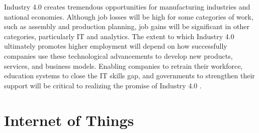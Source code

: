 Industry 4.0 creates tremendous opportunities for manufacturing industries and national economies. Although job losses will be high for some categories of work, such as assembly and production planning, job gains will be significant in other categories, particularly IT and analytics. The extent to which Industry 4.0 ultimately promotes higher employment will depend on how successfully companies use these technological advancements to develop new products, services, and business models. Enabling companies to retrain their workforce, education systems to close the IT skills gap, and governments to strengthen their support will be critical to realizing the promise of Industry 4.0 \cite{MANMACHINE,INDUSINTERNET}.
\section{Internet of Things}
